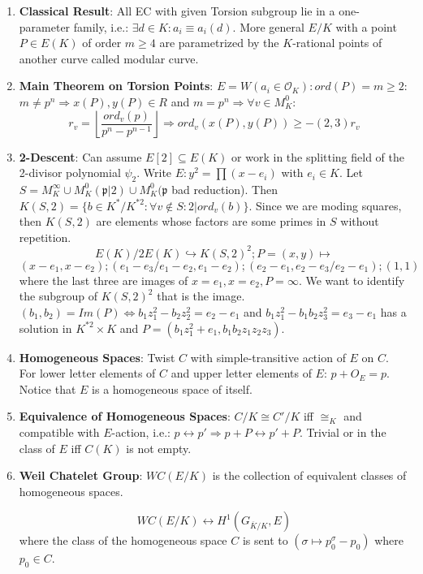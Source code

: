 \documentclass{article}
\newcommand{\OO}{\mathcal{O}}
\newcommand{\pp}{\mathfrak{p}}
\newcommand{\Ra}{\Rightarrow}
\newcommand{\lra}{\leftrightarrow}
\newcommand{\Lra}{\Leftrightarrow}
\newcommand{\hra}{\hookrightarrow}
\newcommand{\ACK}{\overline{K}}
\begin{document}
\begin{multicols}{2}
\begin{enumerate}
\item \textbf{Classical Result}: All EC with given Torsion subgroup lie in a one-parameter family, i.e.: $\exists d \in K: a_i \equiv a_i(d)$. More general $E/K$ with a point $P \in E(K)$ of order $m \geq 4$ are parametrized by the $K$-rational points of another curve called modular curve. 


\item \textbf{Main Theorem on Torsion Points}: $E = W(a_i \in \OO_K): ord(P) = m \geq 2$: $m \neq p^n \Ra x(P),y(P) \in R$ and $m = p^n \Ra \forall v \in M_K^0:$
\[r_v = \left\lfloor \frac{ord_v(p)}{p^n - p^{n-1}}\right\rfloor \Ra ord_v(x(P),y(P)) \geq -(2,3)r_v\]

\item \textbf{2-Descent}: Can assume $E[2] \subseteq E(K)$ or work in the splitting field of the 2-divisor polynomial $\psi_2$. Write $E: y^2 = \prod(x-e_i)$ with $e_i \in K$. Let $S = M_K^\infty \cup M_K^0(\pp|2) \cup M_K^0(\pp$ bad reduction). Then $K(S,2) = \{b \in K^*/K^{*2}: \forall v \notin S: 2|ord_v(b)\}$. Since we are moding squares, then $K(S,2)$ are elements whose factors are some primes in $S$ without repetition.
\[E(K)/2E(K) \hra K(S,2)^2; P = (x,y) \mapsto \]
\[(x-e_1,x-e_2); (e_1-e_3/e_1-e_2,e_1-e_2); (e_2-e_1, e_2-e_3/e_2-e_1); (1,1)\]
where the last three are images of $x =e_1,x=e_2, P = \infty$. We want to identify the subgroup of $K(S,2)^2$ that is the image. $(b_1,b_2) = Im(P) \Lra b_1z_1^2 - b_2z_2^2 = e_2 -e_1$ and $b_1z_1^2 - b_1b_2z_3^2 = e_3 - e_1$ has a solution in $K^{*2} \times K$ and $P = (b_1z_1^2 + e_1, b_1b_2z_1z_2z_3)$.  

\item \textbf{Homogeneous Spaces}: Twist $C$ with simple-transitive action of $E$ on $C$. For lower letter elements of $C$ and upper letter elements of $E$: $p + O_E = p$. Notice that $E$ is a homogeneous space of itself. 

\item \textbf{Equivalence of Homogeneous Spaces}: $C/K \cong C'/K$ iff $\cong_K$ and compatible with $E$-action, i.e.: $p \lra p' \Ra p + P \lra p' + P$. Trivial or in the class of $E$ iff $C(K)$ is not empty. 

\item \textbf{Weil Chatelet Group}: $WC(E/K)$ is the collection of equivalent classes of homogeneous spaces. 

\[WC(E/K) \lra H^1(G_{\ACK/K}, E)\]
where the class of the homogeneous space $C$ is sent to $(\sigma \mapsto p_0^\sigma - p_0)$ where $p_0 \in C$. 


\end{enumerate}
\end{multicols}
\end{document}
